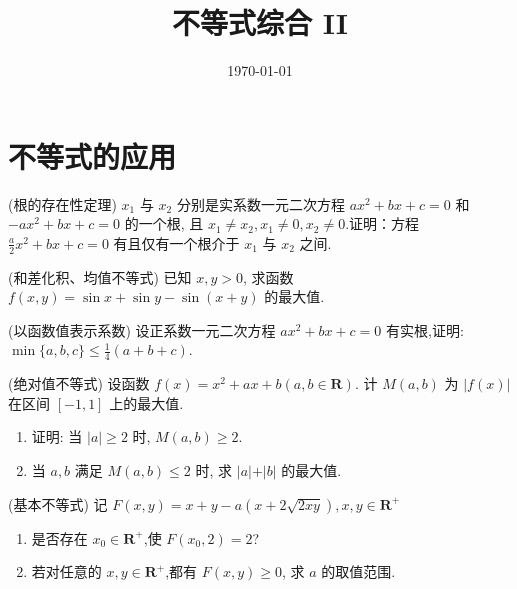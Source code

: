 \documentclass[a4paper , final]{ctexart}
\title{不等式综合 II}
\date{\today}
\newenvironment{problem}[1]{%
  \item #1
  \par
  \vspace{8cm}
}{}
\begin{document}
\maketitle


\section*{不等式的应用}
 
\begin{problems}
  \begin{problem}
  {(根的存在性定理)
  $x_1$ 与 $x_2$ 分别是实系数一元二次方程 $ax^2 + bx + c = 0$ 和 $-ax^2 + bx + c = 0$ 的一个根, 且 $x_1 \ne x_2, x_1 \ne 0, x_2 \ne 0$.证明：方程 $\frac{a}{2}x^2 + bx + c = 0$ 有且仅有一个根介于 $x_1$ 与 $x_2$ 之间.
  }
  \end{problem}

  \begin{problem}
  {(和差化积、均值不等式)
  已知 $x, y > 0$, 求函数 $f(x,y) = \sin x + \sin y - \sin(x+y)$ 的最大值.
  }
  \end{problem}

  \begin{problem}
    {(以函数值表示系数)
      设正系数一元二次方程 $ax^2 + bx + c = 0$ 有实根,证明: $\min\{a,b,c\}\leq\frac{1}{4}(a+b+c)$.
    }
  \end{problem}

  \begin{problem}
    {(绝对值不等式)
      设函数 $f(x) = x^2+ax+b(a,b\in\mathbf{R})$. 计 $M(a,b)$ 为 $\vert f(x)\vert$ 在区间 $[-1,1]$ 上的最大值.
      \begin{enumerate}[label=(\arabic*)]
        \item 证明: 当 $\vert a\vert\ge 2$ 时, $M(a,b) \geq 2$.
        \item 当 $a,b$ 满足 $M(a,b)\leq 2$ 时, 求 $\vert a\vert + \vert b\vert$ 的最大值.
      \end{enumerate} 
    }
  \end{problem}

  \newpage
  \begin{problem}
    {(基本不等式)
      记 $F(x,y)=x+y-a(x+2\sqrt{2xy}),x,y\in\mathbf{R}^+$
      \begin{enumerate}[label=(\arabic*)]
        \item 是否存在 $x_0\in\mathbf{R}^+$,使 $F(x_0,2)=2$?
        \item 若对任意的 $x,y\in\mathbf{R}^+$,都有 $F(x,y)\geq 0$, 求 $a$ 的取值范围.
      \end{enumerate}
    }
  \end{problem}


\end{problems}
\end{document}
